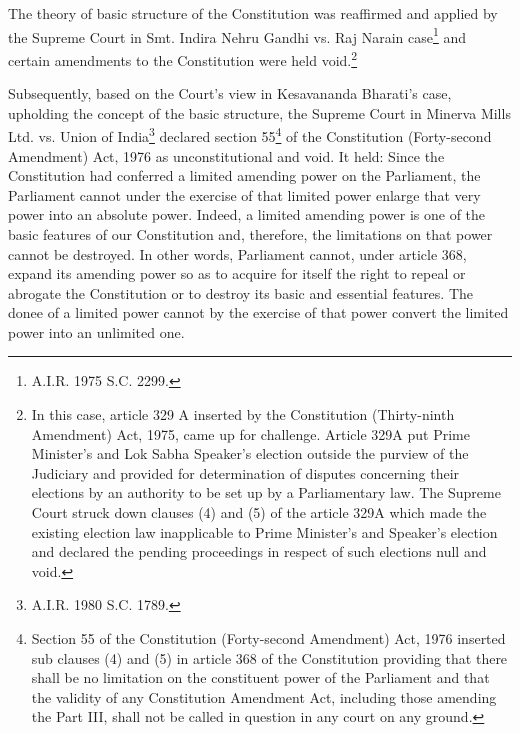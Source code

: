 \begin{multicols}{2}
\vspace{-.1cm}

\noi
The theory of basic structure of the Constitution was reaffirmed and applied by the Supreme
Court in Smt. Indira Nehru Gandhi vs. Raj Narain case\footnote{A.I.R. 1975 S.C. 2299.} and certain amendments to the
Constitution were held void.\footnote{In this case, article 329 A inserted by the Constitution (Thirty-ninth Amendment) Act, 1975, came up for challenge. Article 329A put Prime Minister’s and Lok Sabha Speaker’s election outside the purview of the
Judiciary and provided for determination of disputes concerning their elections by an authority to be set up by a
Parliamentary law. The Supreme Court struck down clauses (4) and (5) of the article 329A which made the
existing election law inapplicable to Prime Minister’s and Speaker’s election and declared the pending
proceedings in respect of such elections null and void.}

\vspace{-.1cm}

\noi
Subsequently, based on the Court’s view in Kesavananda Bharati’s case, upholding the
concept of the basic structure, the Supreme Court in Minerva Mills Ltd. vs. Union of India\footnote{A.I.R. 1980 S.C. 1789.}
declared section 55\footnote{Section 55 of the Constitution (Forty-second Amendment) Act, 1976 inserted sub clauses (4) and (5) in article 368 of the Constitution providing that there shall be no limitation on the constituent power of the Parliament and
that the validity of any Constitution Amendment Act, including those amending the Part III, shall not be called in
question in any court on any ground.} of the Constitution (Forty-second Amendment) Act, 1976 as
unconstitutional and void. It held: Since the Constitution had conferred a limited amending
power on the Parliament, the Parliament cannot under the exercise of that limited power
enlarge that very power into an absolute power. Indeed, a limited amending power is one of
the basic features of our Constitution and, therefore, the limitations on that power cannot be
destroyed. In other words, Parliament cannot, under article 368, expand its amending power
so as to acquire for itself the right to repeal or abrogate the Constitution or to destroy its basic
and essential features. The donee of a limited power cannot by the exercise of that power
convert the limited power into an unlimited one.

\vspace{-.1cm}


\end{multicols}
